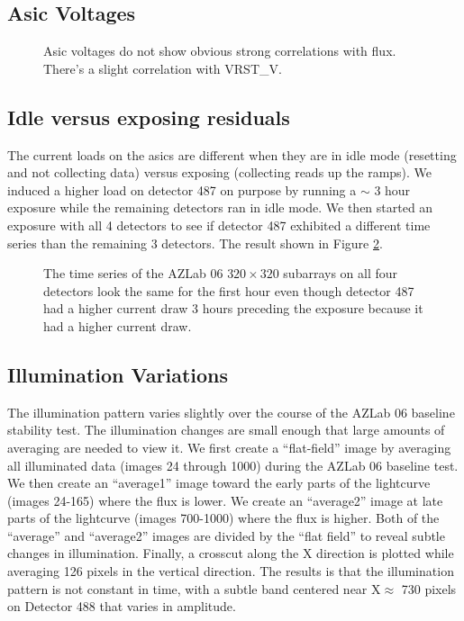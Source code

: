\documentclass{aastex62}
\begin{document}
\clearpage

\subsection{Asic Voltages}
\begin{figure}
\caption{Asic voltages do not show obvious strong correlations with flux. There's a slight correlation with VRST\_V.
}\label{fig:asicVoltageAndFlux}
\end{figure}

\clearpage

\subsection{Idle versus exposing residuals}
The current loads on the asics are different when they are in idle mode (resetting and not collecting data) versus exposing (collecting reads up the ramps).
We induced a higher load on detector 487 on purpose by running a $\sim$ 3 hour exposure while the remaining detectors ran in idle mode.
We then started an exposure with all 4 detectors to see if detector 487 exhibited a different time series than the remaining 3 detectors.
The result shown in Figure \ref{fig:idleVersusExposing320}.
\begin{figure}
\caption{The time series of the AZLab 06 $320 \times 320$ subarrays on all four detectors look the same for the first hour even though detector 487 had a higher current draw 3 hours preceding the exposure because it had a higher current draw.}\label{fig:idleVersusExposing320}
\end{figure}

\clearpage

\subsection{Illumination Variations}

The illumination pattern varies slightly over the course of the AZLab 06 baseline stability test.
The illumination changes are small enough that large amounts of averaging are needed to view it.
We first create a ``flat-field'' image by averaging all illuminated data (images 24 through 1000) during the AZLab 06 baseline test.
We then create an ``average1'' image toward the early parts of the lightcurve (images 24-165) where the flux is lower.
We create an ``average2'' image at late parts of the lightcurve (images 700-1000) where the flux is higher.
Both of the ``average'' and ``average2'' images are divided by the ``flat field'' to reveal subtle changes in illumination.
Finally, a crosscut along the X direction is plotted while averaging 126 pixels in the vertical direction.
The results is that the illumination pattern is not constant in time, with a subtle band centered near X$\approx$ 730 pixels on Detector 488 that varies in amplitude.
\end{document}
